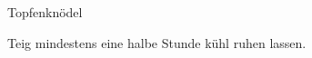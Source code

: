 \begin{recipe}{Topfenknödel}

    \begin{ingredients}
    \end{ingredients}

    \begin{instructions}
        Teig mindestens eine halbe Stunde kühl ruhen lassen.
    \end{instructions}
\end{recipe}

